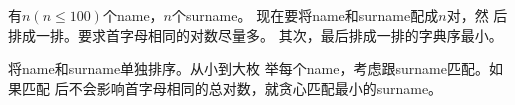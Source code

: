 \begin{prob}
	有$n(n\le 100)$个name，$n$个surname。
	现在要将name和surname配成$n$对，然
	后排成一排。要求首字母相同的对数尽量多。
	其次，最后排成一排的字典序最小。
\end{prob}

\begin{sol}
	将name和surname单独排序。从小到大枚
	举每个name，考虑跟surname匹配。如果匹配
	后不会影响首字母相同的总对数，就贪心匹配最小的surname。
\end{sol}

